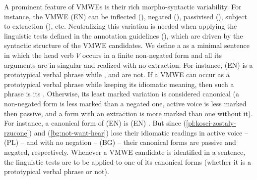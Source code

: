 \documentclass[output=paper,
modfonts,
]{langscibook}
\begin{document}

A prominent feature of VMWEs is their rich morpho-syntactic variability. For instance, the VMWE (EN)  can be inflected (), negated (), passivised (), subject to extraction (), etc. Neutralizing this variation is needed when applying the linguistic tests defined in the annotation guidelines (), which are driven by the syntactic structure of the VMWE candidates. 
%
We define a  as a minimal sentence in which the head verb $V$ occurs in a finite non-negated form and all its arguments are in singular and realized with no extraction. For instance, (EN)  is a prototypical verbal phrase while ,  and  are not. If a VMWE can occur as a prototypical verbal phrase while keeping its idiomatic meaning, then such a phrase is its . Otherwise, its least marked variation is considered canonical (a non-negated form is less marked than a negated one, active voice is less marked then passive, and a form with an extraction is more marked than one without it). For instance, a canonical form of (EN)  is (EN) . But since (\ref{pl:kosci-zostaly-rzucone}) and (\ref{bg:not-want-hear})
lose their idiomatic readings in active voice -- (PL)  -- and with no negation -- (BG)  -- their canonical forms are passive and negated, respectively. 
Whenever a VMWE candidate is identified in a sentence, the linguistic tests are to be applied to one of its canonical forms (whether it is a prototypical verbal phrase or not).
\end{document}
